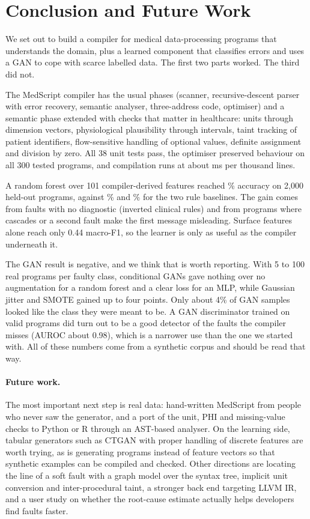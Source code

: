 \section{Conclusion and Future Work}

We set out to build a compiler for medical data-processing programs that understands the domain, plus a learned
component that classifies errors and uses a GAN to cope with scarce labelled data. The first two parts worked. The third
did not.

The MedScript compiler has the usual phases (scanner, recursive-descent parser with error recovery, semantic analyser,
three-address code, optimiser) and a semantic phase extended with checks that matter in healthcare: units through
dimension vectors, physiological plausibility through intervals, taint tracking of patient identifiers, flow-sensitive
handling of optional values, definite assignment and division by zero. All 38 unit tests pass, the optimiser preserved
behaviour on all 300 tested programs, and compilation runs at about \MsPerKloc{} ms per thousand lines.

A random forest over 101 compiler-derived features reached \RFAcc\% accuracy on 2{,}000 held-out programs, against
\RuleFirstAcc\% and \RulePrioAcc\% for the two rule baselines. The gain comes from faults with no diagnostic (inverted
clinical rules) and from programs where cascades or a second fault make the first message misleading. Surface features
alone reach only 0.44 macro-F1, so the learner is only as useful as the compiler underneath it.

The GAN result is negative, and we think that is worth reporting. With 5 to 100 real programs per faulty class,
conditional GANs gave nothing over no augmentation for a random forest and a clear loss for an MLP, while Gaussian jitter
and SMOTE gained up to four points. Only about 4\% of GAN samples looked like the class they were meant to be. A GAN
discriminator trained on valid programs did turn out to be a good detector of the faults the compiler misses (AUROC about
0.98), which is a narrower use than the one we started with. All of these numbers come from a synthetic corpus and should
be read that way.

\paragraph{Future work.} The most important next step is real data: hand-written MedScript from people who never saw the
generator, and a port of the unit, PHI and missing-value checks to Python or R through an AST-based analyser. On the
learning side, tabular generators such as CTGAN with proper handling of discrete features are worth trying, as is
generating programs instead of feature vectors so that synthetic examples can be compiled and checked. Other directions
are locating the line of a soft fault with a graph model over the syntax tree, implicit unit conversion and
inter-procedural taint, a stronger back end targeting LLVM IR, and a user study on whether the root-cause estimate
actually helps developers find faults faster.

